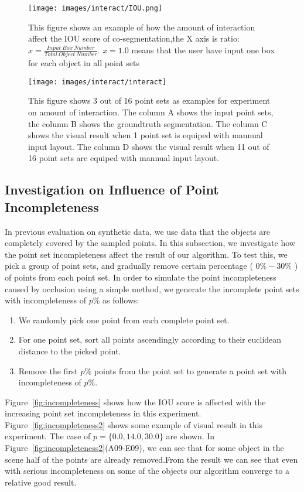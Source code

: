 \begin{figure}
	\centering
	\texttt{[image: images/interact/IOU.png]}
	\caption{This figure shows an example of how the amount of interaction affect the IOU score of co-segmentation,the X axis is ratio: $x=\frac{Input~Box~Number}{Total~Object~Number}$. $x=1.0$ means that the user have input one box for each object in all point sets}
	\label{fig:interact_number}
\end{figure}

\begin{figure}
	\centering
	\texttt{[image: images/interact/interact]}
	\caption{This figure shows 3 out of 16 point sets as examples for experiment on amount of interaction. The column A shows the input point sets, the column B shows the groundtruth segmentation. The column C shows the visual result when 1 point set is equiped with mannual input layout. The column D shows the visual result when 11 out of 16 point sets are equiped with mannual input layout.
	}
	\label{fig:interact_vis}
\end{figure}

\subsection{Investigation on Influence of Point Incompleteness}
\label{sec:exp-incompleteness}
In previous evaluation on synthetic data, we use data that the objects are completely covered by the sampled points. 
%
In this subsection, we investigate how the point set incompleteness affect the result of our algorithm. 
%
To test this, we pick a group of point sets, and gradually remove certain percentage ( $0\%-30\%$ ) of points from each point set. In order to simulate the point incompleteness caused by occlusion using a simple method, we generate the incomplete point sets with incompleteness of $p\%$ as follows:
\begin{enumerate}
	\item We randomly pick one point from each complete point set. 
	\item For one point set, sort all points ascendingly according to their euclidean distance to the picked point.  
	\item Remove the first $p\%$ points from the point set to generate a point set with incompleteness of $p\%$.
\end{enumerate}
% 
Figure~\ref{fig:incompleteness} shows how the IOU score is affected with the increasing point set incompleteness in this experiment. 
Figure~\ref{fig:incompleteness2} shows some example of visual result in this experiment. The case of $p=\{0.0,14.0,30.0\}$ are shown. In Figure~\ref{fig:incompleteness2}(A09-E09), we can see that for some object in the scene half of the points are already removed.From the result we can see that even with serious incompleteness on some of the objects our algorithm converge to a relative good result.

